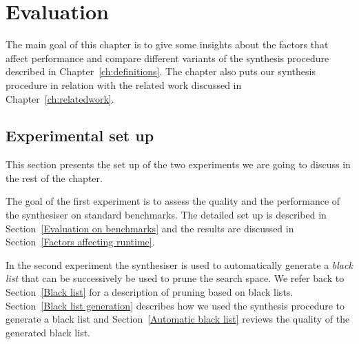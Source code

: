 \lstset{style=plain}

\chapter{Evaluation} \label{evaluation}

The main goal of this chapter is to give some insights about the factors that affect performance and compare different variants of the synthesis procedure described in Chapter~\ref{ch:definitions}. The chapter also puts our synthesis procedure in relation with the related work discussed in Chapter~\ref{ch:relatedwork}.


\section{Experimental set up}
This section presents the set up of the two experiments we are going to discuss in the rest of the chapter.

The goal of the first experiment is to assess the quality and the performance of the synthesiser on standard benchmarks. The detailed set up is described in Section~\ref{Evaluation on benchmarks} and the results are discussed in Section~\ref{Factors affecting runtime}.

In the second experiment the synthesiser is used to automatically generate a \emph{black list} that can be successively be used to prune the search space. We refer back to Section~\ref{Black list} for a description of pruning based on black lists. Section~\ref{Black list generation} describes how we used the synthesis procedure to generate a black list and Section~\ref{Automatic black list} reviews the quality of the generated black list.

